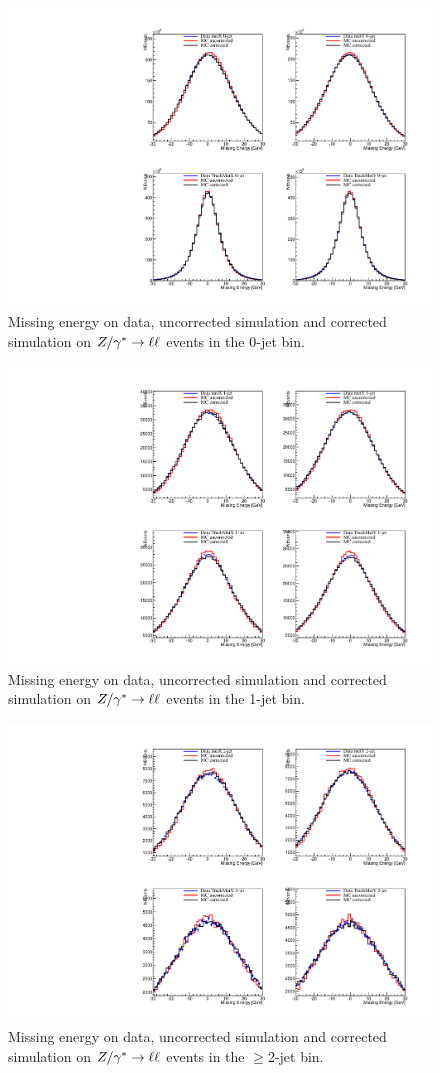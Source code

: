 \begin{figure}[hbt]
\begin{center}
\includegraphics[width=0.75\linewidth]{figures/test0_met_zll.pdf} 
\caption{\label{fig:test0_met_zll} Missing energy on data, 
uncorrected simulation and corrected simulation on $Z/\gamma^*\to\ell\ell$ events in 
the 0-jet bin.}
\end{center}
\end{figure}


\begin{figure}[hbt]
\begin{center}
\includegraphics[width=0.75\linewidth]{figures/test1_met_zll.pdf} 
\caption{\label{fig:test1_met_zll} Missing energy on data, 
uncorrected simulation and corrected simulation on $Z/\gamma^*\to\ell\ell$ events in 
the 1-jet bin.}
\end{center}
\end{figure}

\begin{figure}[hbt]
\begin{center}
\includegraphics[width=0.75\linewidth]{figures/test2_met_zll.pdf} 
\caption{\label{fig:test2_met_zll} Missing energy on data, 
uncorrected simulation and corrected simulation on $Z/\gamma^*\to\ell\ell$ events in 
the $\geq$2-jet bin.}
\end{center}
\end{figure}

\clearpage 
